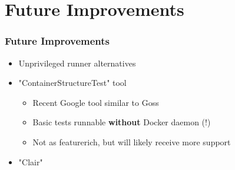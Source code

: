 \documentclass[14pt,aspectratio=169]{beamer}
\begin{document}
\section{Future Improvements}

\begin{frame}
  \frametitle{Future Improvements}
  \begin{itemize}
    \item Unprivileged runner alternatives
    \item "ContainerStructureTest" tool
    \begin{itemize}
      \item Recent Google tool similar to Goss
      \item Basic tests runnable \textbf{without} Docker daemon (!)
      \item Not as featurerich, but will likely receive more support
    \end{itemize}
    \item "Clair"
  \end{itemize}
\end{frame}

\section{}

\cernSplashWhite
\end{document}
